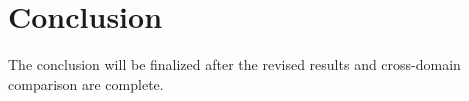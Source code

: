 \section{Conclusion}

The conclusion will be finalized after the revised results and cross-domain comparison are complete.
